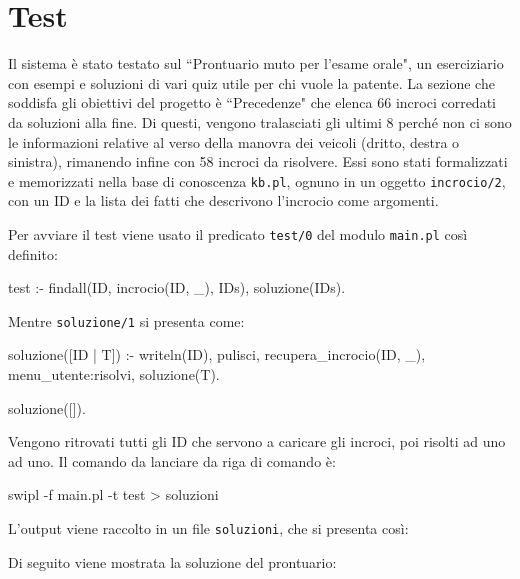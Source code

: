 \chapter{Test}
Il sistema è stato testato sul ``Prontuario muto per l'esame orale"\cite{Prontuario}, un eserciziario con esempi e soluzioni di vari quiz utile per chi vuole la patente. La sezione che soddisfa gli obiettivi del progetto è ``Precedenze" che elenca 66 incroci corredati da soluzioni alla fine. Di questi, vengono tralasciati gli ultimi 8 perché non ci sono le informazioni relative al verso della manovra dei veicoli (dritto, destra o sinistra), rimanendo infine con 58 incroci da risolvere. Essi sono stati formalizzati e memorizzati nella base di conoscenza \texttt{kb.pl}, ognuno in un oggetto \texttt{incrocio/2}, con un ID e la lista dei fatti che descrivono l'incrocio come argomenti.

Per avviare il test viene usato il predicato \texttt{test/0} del modulo \texttt{main.pl} così definito:


\begin{verbatimtab}
test :-
	findall(ID, incrocio(ID, _), IDs),
	soluzione(IDs).
\end{verbatimtab}

\noindent
Mentre \texttt{soluzione/1} si presenta come:
\begin{verbatimtab}
soluzione([ID | T]) :-
	writeln(ID),
	pulisci,
	recupera_incrocio(ID, _),
	menu_utente:risolvi,
	soluzione(T).

soluzione([]).
\end{verbatimtab}

Vengono ritrovati tutti gli ID che servono a caricare gli incroci, poi risolti ad uno ad uno. Il comando da lanciare da riga di comando è:
\begin{verbatimtab}
swipl -f main.pl -t test > soluzioni
\end{verbatimtab}

\noindent
L'output viene raccolto in un file \texttt{soluzioni}, che si presenta così:
\scriptsize

\normalsize
Di seguito viene mostrata la soluzione del prontuario:

